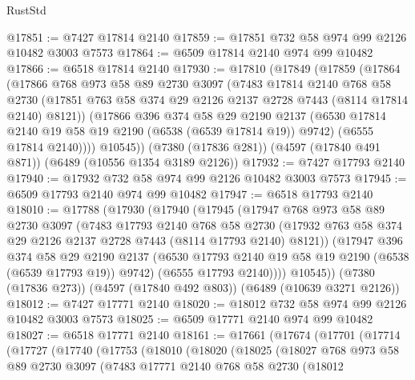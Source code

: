 \begin{lexlean}{RustStd}
\begin{coremodule}
@17851 := @7427 @17814 @2140
@17859 := @17851 @732 @58 @974 @99 @2126 @10482 @3003 @7573
@17864 := @6509 @17814 @2140 @974 @99 @10482
@17866 := @6518 @17814 @2140
@17930 := @17810
    (@17849
      (@17859
        (@17864
          (@17866
            @768
            @973
            @58
            @89
            @2730
            @3097
            (@7483
              @17814
              @2140
              @768
              @58
              @2730
              (@17851 @763 @58 @374 @29 @2126 @2137 @2728 @7443 (@8114 @17814 @2140) @8121))
            (@17866
              @396
              @374
              @58
              @29
              @2190
              @2137
              (@6530 @17814 @2140 @19 @58 @19 @2190 (@6538 (@6539 @17814 @19)) @9742)
              (@6555 @17814 @2140))))
        @10545))
    (@7380 (@17836 @281))
    (@4597 (@17840 @491 @871))
    (@6489 (@10556 @1354 @3189 @2126))
@17932 := @7427 @17793 @2140
@17940 := @17932 @732 @58 @974 @99 @2126 @10482 @3003 @7573
@17945 := @6509 @17793 @2140 @974 @99 @10482
@17947 := @6518 @17793 @2140
@18010 := @17788
    (@17930
      (@17940
        (@17945
          (@17947
            @768
            @973
            @58
            @89
            @2730
            @3097
            (@7483
              @17793
              @2140
              @768
              @58
              @2730
              (@17932 @763 @58 @374 @29 @2126 @2137 @2728 @7443 (@8114 @17793 @2140) @8121))
            (@17947
              @396
              @374
              @58
              @29
              @2190
              @2137
              (@6530 @17793 @2140 @19 @58 @19 @2190 (@6538 (@6539 @17793 @19)) @9742)
              (@6555 @17793 @2140))))
        @10545))
    (@7380 (@17836 @273))
    (@4597 (@17840 @492 @803))
    (@6489 (@10639 @3271 @2126))
@18012 := @7427 @17771 @2140
@18020 := @18012 @732 @58 @974 @99 @2126 @10482 @3003 @7573
@18025 := @6509 @17771 @2140 @974 @99 @10482
@18027 := @6518 @17771 @2140
@18161 := @17661
    (@17674
      (@17701
        (@17714
          (@17727
            (@17740
              (@17753
                (@18010
                  (@18020
                    (@18025
                      (@18027
                        @768
                        @973
                        @58
                        @89
                        @2730
                        @3097
                        (@7483
                          @17771
                          @2140
                          @768
                          @58
                          @2730
                          (@18012

\end{coremodule}
\end{lexlean}

